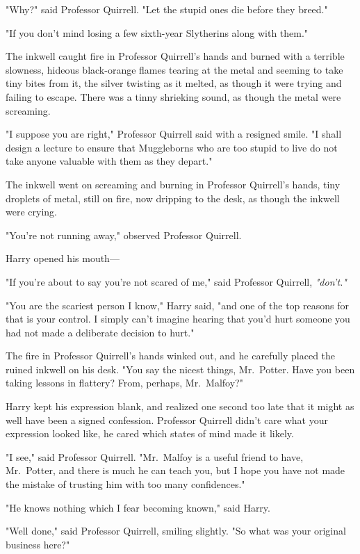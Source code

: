 "Why?" said Professor Quirrell. "Let the stupid ones die before they breed."

"If you don't mind losing a few sixth-year Slytherins along with them."

The inkwell caught fire in Professor Quirrell's hands and burned with a
terrible slowness, hideous black-orange flames tearing at the metal and seeming
to take tiny bites from it, the silver twisting as it melted, as though it were
trying and failing to escape. There was a tinny shrieking sound, as though the
metal were screaming.

"I suppose you are right," Professor Quirrell said with a resigned smile. "I
shall design a lecture to ensure that Muggleborns who are too stupid to live do
not take anyone valuable with them as they depart."

The inkwell went on screaming and burning in Professor Quirrell's hands, tiny
droplets of metal, still on fire, now dripping to the desk, as though the
inkwell were crying.

"You're not running away," observed Professor Quirrell.

Harry opened his mouth\mbox{---}

"If you're about to say you're not scared of me," said Professor Quirrell,
\emph{"don't."}

"You are the scariest person I know," Harry said, "and one of the top reasons
for that is your control. I simply can't imagine hearing that you'd hurt
someone you had not made a deliberate decision to hurt."

The fire in Professor Quirrell's hands winked out, and he carefully placed the
ruined inkwell on his desk. "You say the nicest things, Mr.~Potter. Have you
been taking lessons in flattery? From, perhaps, Mr.~Malfoy?"

Harry kept his expression blank, and realized one second too late that it might
as well have been a signed confession. Professor Quirrell didn't care what your
expression looked like, he cared which states of mind made it likely.

"I see," said Professor Quirrell. "Mr.~Malfoy is a useful friend to have,
Mr.~Potter, and there is much he can teach you, but I hope you have not made
the mistake of trusting him with too many confidences."

"He knows nothing which I fear becoming known," said Harry.

"Well done," said Professor Quirrell, smiling slightly. "So what was your
original business here?"

